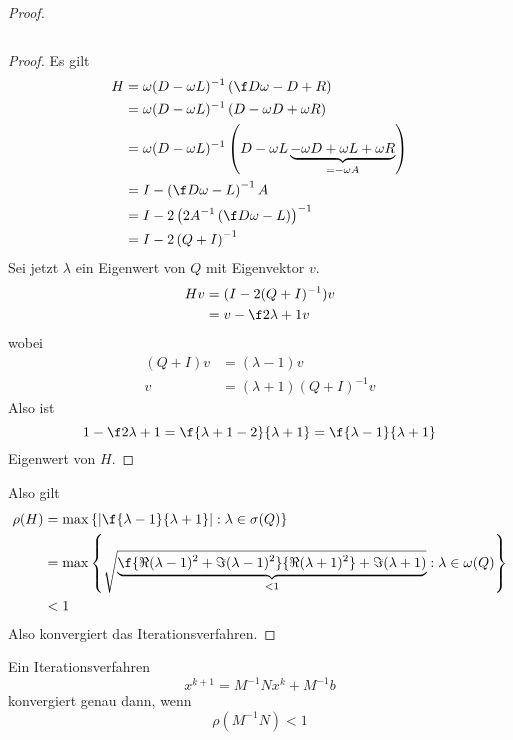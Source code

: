 \documentclass{mycourse}
\begin{document}
\begin{st}
\begin{proof}
\begin{enumerate}[{Beh. }1:]
\[				\]
				\begin{proof}
					Es gilt
					\begin{align*}
						H &= \omega(D-\omega L)^{-1} \left(\f D\omega -D+R\right)\\
						  &= \omega(D-\omega L)^{-1} \left(D - \omega D +\omega R\right)\\
						  &= \omega(D-\omega L)^{-1} \left(D - \omega L \underbrace{- \omega D +\omega L + \omega R}_{=-\omega A}\right)\\
						  &= I -\left( \f D\omega -L\right)^{-1} A\\
						  &= I - 2 \left( 2A^{-1} \left( \f D\omega -L\right)\right)^{-1}\\
						  &= I- 2 \left(Q+I\right)^{-1}
					\end{align*}
					Sei jetzt $\lambda$ ein Eigenwert von $Q$ mit Eigenvektor $v$.
					\begin{align*}
						Hv &= (I - 2(Q+I)^{-1})v\\
						   &= v-\f 2{\lambda+1}v
					\end{align*}
					wobei
					\begin{align*}
						(Q+I)v &=(\lambda -1)v\\
						v &= (\lambda+1)(Q+I)^{-1}v
					\end{align*}
					Also ist 
					\[
						1-\f 2{\lambda +1}=	\f {\lambda+1-2}{\lambda+1} = \f {\lambda-1}{\lambda+1}
					\]
					Eigenwert von $H$.
				\end{proof}
		\end{enumerate}
		Also gilt
		\begin{align*}
			\rho(H) &= \max\left\{\left |\f {\lambda-1}{\lambda+1}\right| : \lambda\in \sigma(Q)\right\}\\
								   &= \max\left\{\sqrt{\underbrace{\f {\Re (\lambda-1)^2 + \Im (\lambda -1)^2}{\Re(\lambda+1)^2} + \Im(\lambda+1)}_{<1}}:\lambda \in \omega(Q)\right\}\\
					&< 1
		\end{align*}
		Also konvergiert das Iterationsverfahren.		
	\end{proof}
\end{st}

\setcounter{thm}{11}

\begin{st}
	\label{st:4.12}
	Ein Iterationsverfahren
	\[
		x^{k+1} = M^{-1}Nx^k + M^{-1}b
	\]
	konvergiert genau dann, wenn
	\[
		\rho(M^{-1}N) < 1
	\]
\end{st}
\end{document}
